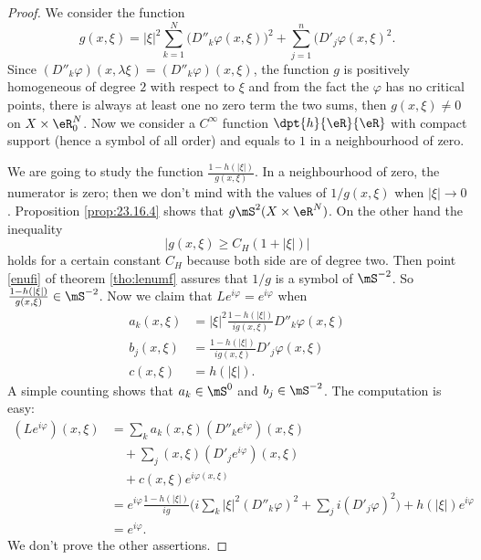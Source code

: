 \begin{proof}
We consider the function
\[ 
  g(x,\xi)=| \xi |^2\sum_{k=1}^N\big( D''_k\varphi(x,\xi) \big)^2+\sum_{j=1}^n\big( D'_j\varphi(x,\xi)^2.
\]
Since $(D''_k\varphi)(x,\lambda\xi)=(D''_k\varphi)(x,\xi)$, the function $g$ is positively homogeneous of degree $2$ with respect to $\xi$ and from the fact the $\varphi$ has no critical points, there is always at least one no zero term the two sums, then $g(x,\xi)\neq 0$ on $X\times\eR^N_0$. Now we consider a $C^{\infty}$ function $\dpt{h}{\eR}{\eR}$ with compact support (hence a symbol of all order) and equals to $1$ in a neighbourhood of zero.

We are going to study the function $\frac{1-h(| \xi |)}{g(x,\xi)}$. In a neighbourhood of zero, the numerator is zero; then we don't mind with the values of $1/g(x,\xi)$ when $| \xi |\to 0$. Proposition \ref{prop:23.16.4} shows that $g\mS^2(X\times\eR^N)$. On the other hand the inequality
\[ 
  | g(x,\xi)\geq C_H(1+| \xi |) |
\]
holds for a certain constant $C_H$ because both side are of degree two. Then point \ref{enufi} of theorem \ref{tho:lenumf} assures that $1/g$ is a symbol of $ \mS^{-2}$. So $\frac{1-h(| \xi |)}{g(x,\xi)}\in\mS^{-2}$. Now we claim that $Le^{i\varphi}=e^{i\varphi}$ when
\begin{equation}
\begin{aligned}
a_k(x,\xi)&=| \xi |^2\frac{1-h(| \xi |)}{ig(x,\xi)}D''_k\varphi(x,\xi)\\
b_j(x,\xi)&=\frac{1-h(| \xi |)}{ig(x,\xi)}D'_j\varphi(x,\xi)\\
c(x,\xi)&=h(| \xi |).
\end{aligned}
\end{equation}
A simple counting shows that $a_k\in\mS^0$ and $b_j\in\mS^{-2}$. The computation is easy:
\begin{equation}
\begin{split}
  (Le^{i\varphi})(x,\xi)&=\sum_ka_k(x,\xi)(D''_ke^{i\varphi})(x,\xi)\\
                          &\quad+\sum_j(x,\xi)(D'_je^{i\varphi})(x,\xi)\\
                          &\quad+c(x,\xi)e^{i\varphi(x,\xi)}\\
                        &=e^{i\varphi}\frac{1-h(| \xi |)}{ig}\Big( i\sum_k| \xi |^2 (D''_k\varphi)^2+\sum_ji(D'_j\varphi)^2 \Big)+h(| \xi |)e^{i\varphi}\\
                        &=e^{i\varphi}.
\end{split}
\end{equation}
We don't prove the other assertions.

\end{proof}

